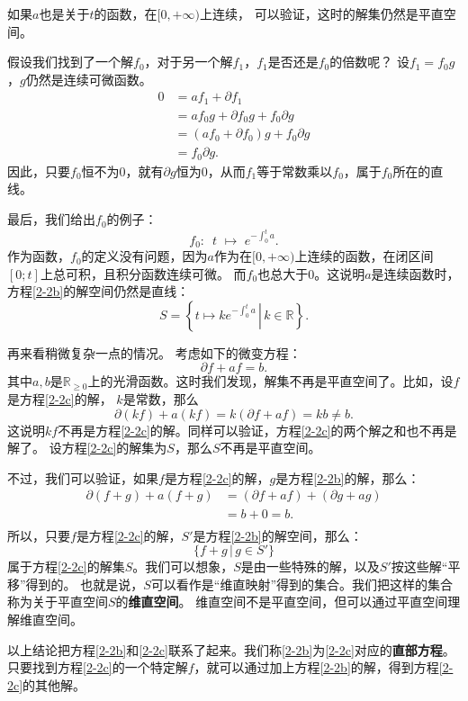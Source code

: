 \documentclass[12pt,UTF8]{ctexbook}
\theoremstyle{definition}
\theoremstyle{plain}
\begin{document}
如果$a$也是关于$t$的函数，在$[0,+\infty)$上连续，
可以验证，这时的解集仍然是平直空间。

假设我们找到了一个解$f_0$，对于另一个解$f_1$，$f_1$是否还是$f_0$的倍数呢？
设$f_1 = f_0 g$，$g$仍然是连续可微函数。
\begin{align*}
    0 &= af_1 + \partial f_1 \\
    &= a f_0 g + \partial f_0 g + f_0 \partial g \\
    &= (af_0 + \partial f_0) g + f_0 \partial g \\
    &= f_0 \partial g.
\end{align*}
因此，只要$f_0$恒不为$0$，就有$\partial g$恒为$0$，从而$f_1$等于常数乘以$f_0$，属于$f_0$所在的直线。

最后，我们给出$f_0$的例子：
$$ f_0: \,\,\, t\,\, \mapsto \,\, e^{-\int_0^t a}. $$
作为函数，$f_0$的定义没有问题，因为$a$作为在$[0,+\infty)$上连续的函数，在闭区间$[0; t]$上总可积，且积分函数连续可微。
而$f_0$也总大于$0$。这说明$a$是连续函数时，方程\eqref{2-2b}的解空间仍然是直线：
$$S = \left\{\left.t\mapsto ke^{-\int_0^t a} \, \right| \, k\in\mathbb{R}\right\}.$$

再来看稍微复杂一点的情况。
考虑如下的微变方程：
\begin{equation}
    \partial f + a f = b. \label{2-2c}
\end{equation}
其中$a,b$是$\mathbb{R}_{\geqslant 0}$上的光滑函数。这时我们发现，解集不再是平直空间了。比如，设$f$是方程\eqref{2-2c}的解，
$k$是常数，那么
$$\partial (kf) + a (kf) = k (\partial f + a f) = kb \neq b.$$
这说明$kf$不再是方程\eqref{2-2c}的解。同样可以验证，方程\eqref{2-2c}的两个解之和也不再是解了。
设方程\eqref{2-2c}的解集为$S$，那么$S$不再是平直空间。

不过，我们可以验证，如果$f$是方程\eqref{2-2c}的解，$g$是方程\eqref{2-2b}的解，那么：
\begin{align*}
    \partial (f + g) + a (f + g) &= (\partial f + a f) + (\partial g + a g) \\
    &= b + 0 = b. \\ 
\end{align*}
所以，只要$f$是方程\eqref{2-2c}的解，$S'$是方程\eqref{2-2b}的解空间，那么：
$$ \{f + g \, | \, g\in S'\} $$
属于方程\eqref{2-2c}的解集$S$。我们可以想象，$S$是由一些特殊的解，以及$S'$按这些解“平移”得到的。
也就是说，$S$可以看作是“维直映射”得到的集合。我们把这样的集合称为关于平直空间$S$的\textbf{维直空间}。
维直空间不是平直空间，但可以通过平直空间理解维直空间。

以上结论把方程\eqref{2-2b}和\eqref{2-2c}联系了起来。我们称\eqref{2-2b}为\eqref{2-2c}对应的\textbf{直部方程}。
只要找到方程\eqref{2-2c}的一个特定解$f$，就可以通过加上方程\eqref{2-2b}的解，得到方程\eqref{2-2c}的其他解。
\end{document}
